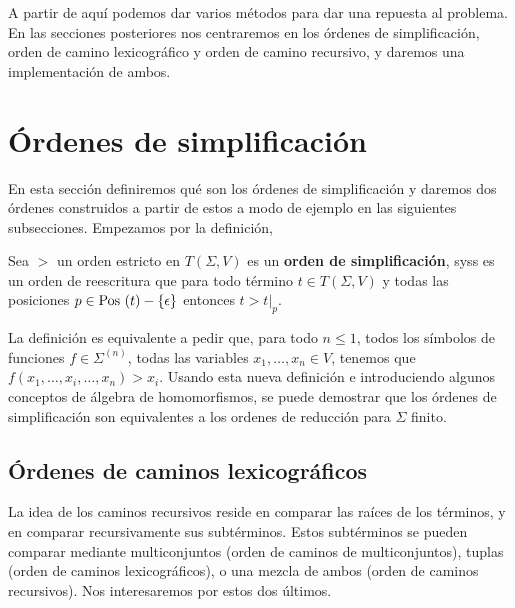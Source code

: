 A partir de aquí podemos dar varios métodos para dar una repuesta al
problema. En las secciones posteriores nos centraremos en los órdenes
de simplificación, orden de camino lexicográfico y orden de camino
recursivo, y daremos una implementación de ambos.

\section{Órdenes de simplificación}

En esta sección definiremos qué son los órdenes de simplificación y
daremos dos órdenes construidos a partir de estos a modo de ejemplo en
las siguientes subsecciones. Empezamos por la definición,

\begin{defi}
  Sea $>$ un orden estricto en $T(\Sigma, V)$ es un \textbf{orden de
  simplificación}, syss es un orden de reescritura que para todo
  término $t \in T(\Sigma, V)$ y todas las posiciones
  $p \in \mbox{Pos }(t) - \{ \epsilon \}$ entonces $t > t|_p$.
\end{defi}

La definición es equivalente a pedir que, para todo $n \leq 1$, todos
los símbolos de funciones $f \in \Sigma^{(n)}$, todas las variables
$x_1, \dots, x_n \in V$, tenemos que
$f(x_1, \dots, x_i, \dots, x_n) > x_i$. Usando esta nueva definición e
introduciendo algunos conceptos de álgebra de homomorfismos, se puede
demostrar que los órdenes de simplificación son equivalentes a los
ordenes de reducción para $\Sigma$ finito.

\subsection{Órdenes de caminos lexicográficos}

La idea de los caminos recursivos reside en comparar las raíces de los
términos, y en comparar recursivamente sus subtérminos. Estos
subtérminos se pueden comparar mediante multiconjuntos (orden de
caminos de multiconjuntos), tuplas (orden de caminos lexicográficos),
o una mezcla de ambos (orden de caminos recursivos). Nos interesaremos
por estos dos últimos.


